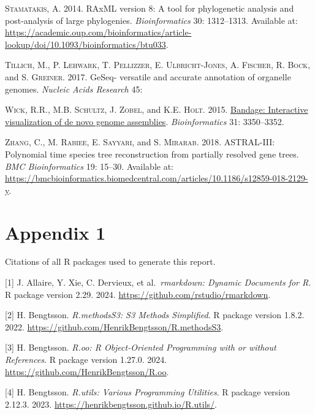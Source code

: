 \documentclass[
  12pt,
]{article}
\newlength{\cslhangindent}
\newlength{\cslentryspacingunit} %
\newenvironment{CSLReferences}[2] %
 {%
  \setlength{\parindent}{0pt}
  \ifodd #1
  \let\oldpar\par
  \def\par{\hangindent=\cslhangindent\oldpar}
  \fi
  \setlength{\parskip}{#2\cslentryspacingunit}
 }%
 {}
\begin{document}
\begin{CSLReferences}{1}{0}
\leavevmode{}%
\textsc{Stamatakis, A.} 2014. RAxML version 8: A tool for phylogenetic analysis and post-analysis of large phylogenies. \emph{Bioinformatics} 30: 1312--1313. Available at: \url{https://academic.oup.com/bioinformatics/article-lookup/doi/10.1093/bioinformatics/btu033}.

\leavevmode{}%
\textsc{Tillich, M.}, \textsc{P. Lehwark}, \textsc{T. Pellizzer}, \textsc{E. Ulbricht-Jones}, \textsc{A. Fischer}, \textsc{R. Bock}, and \textsc{S. Greiner}. 2017. GeSeq- versatile and accurate annotation of organelle genomes. \emph{Nucleic Acids Research} 45:

\leavevmode{}%
\textsc{Wick, R.R.}, \textsc{M.B. Schultz}, \textsc{J. Zobel}, and \textsc{K.E. Holt}. 2015. \href{https://doi.org/10.1093/bioinformatics/btv383}{Bandage: Interactive visualization of de novo genome assemblies}. \emph{Bioinformatics} 31: 3350--3352.

\leavevmode{}%
\textsc{Zhang, C.}, \textsc{M. Rabiee}, \textsc{E. Sayyari}, and \textsc{S. Mirarab}. 2018. ASTRAL-III: Polynomial time species tree reconstruction from partially resolved gene trees. \emph{BMC Bioinformatics} 19: 15--30. Available at: \url{https://bmcbioinformatics.biomedcentral.com/articles/10.1186/s12859-018-2129-y}.

\end{CSLReferences}

\hypertarget{appendix-1}{%
\section{Appendix 1}\label{appendix-1}}

Citations of all R packages used to generate this report.

{[}1{]} J. Allaire, Y. Xie, C. Dervieux, et al.~\emph{rmarkdown: Dynamic
Documents for R}. R package version 2.29. 2024.
\url{https://github.com/rstudio/rmarkdown}.

{[}2{]} H. Bengtsson. \emph{R.methodsS3: S3 Methods Simplified}. R package
version 1.8.2. 2022. \url{https://github.com/HenrikBengtsson/R.methodsS3}.

{[}3{]} H. Bengtsson. \emph{R.oo: R Object-Oriented Programming with or without
References}. R package version 1.27.0. 2024.
\url{https://github.com/HenrikBengtsson/R.oo}.

{[}4{]} H. Bengtsson. \emph{R.utils: Various Programming Utilities}. R package
version 2.12.3. 2023. \url{https://henrikbengtsson.github.io/R.utils/}.
\end{document}
